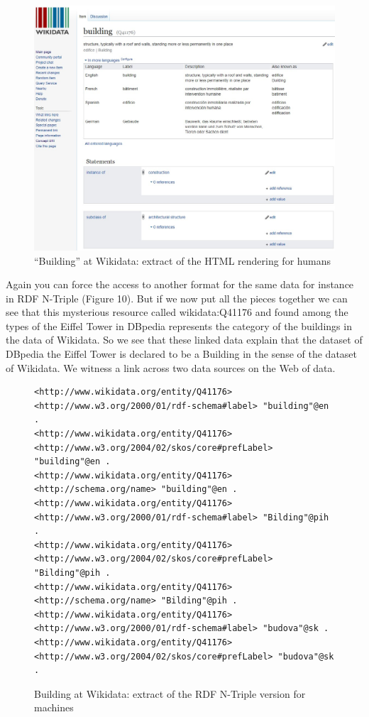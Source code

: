 \begin{figure}
    \centering
    \includegraphics[width=5.0in]{media/figure-05-09.jpg}
    \caption{``Building'' at Wikidata: extract of the HTML rendering for humans}
    \label{fig:ch5.9}
\end{figure}

Again you can force the access to another format for the same data for
instance in RDF N-Triple (Figure 10). But if we now put all the pieces
together we can see that this mysterious resource called wikidata:Q41176
and found among the types of the Eiffel Tower in DBpedia represents the
category of the buildings in the data of Wikidata. So we see that these
linked data explain that the dataset of DBpedia the Eiffel Tower is
declared to be a Building in the sense of the dataset of Wikidata. We
witness a link across two data sources on the Web of data.

\begin{figure}
 \begin{lstlisting}
<http://www.wikidata.org/entity/Q41176> <http://www.w3.org/2000/01/rdf-schema#label> "building"@en .
<http://www.wikidata.org/entity/Q41176> <http://www.w3.org/2004/02/skos/core#prefLabel> "building"@en .
<http://www.wikidata.org/entity/Q41176> <http://schema.org/name> "building"@en .
<http://www.wikidata.org/entity/Q41176> <http://www.w3.org/2000/01/rdf-schema#label> "Bilding"@pih .
<http://www.wikidata.org/entity/Q41176> <http://www.w3.org/2004/02/skos/core#prefLabel> "Bilding"@pih .
<http://www.wikidata.org/entity/Q41176> <http://schema.org/name> "Bilding"@pih .
<http://www.wikidata.org/entity/Q41176> <http://www.w3.org/2000/01/rdf-schema#label> "budova"@sk .
<http://www.wikidata.org/entity/Q41176> <http://www.w3.org/2004/02/skos/core#prefLabel> "budova"@sk .
\end{lstlisting}
    \caption{Building at Wikidata: extract of the RDF N-Triple version for
machines}
    \label{fig:ch5.10}
\end{figure}


